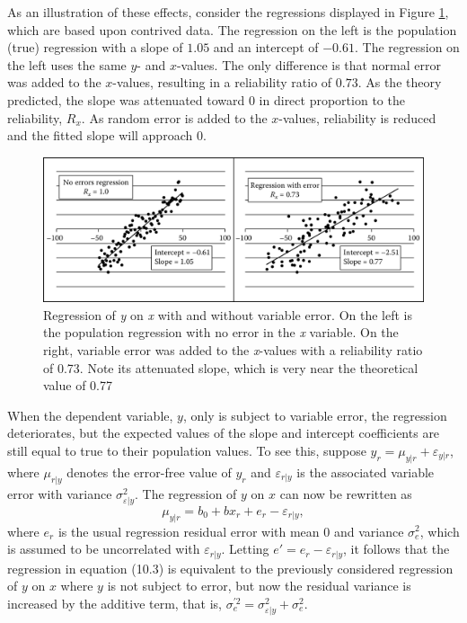 \documentclass[]{krantz}
\begin{document}
As an illustration of these effects, consider the regressions displayed
in Figure \ref{fig:fig10-6}, which are based upon contrived data. The
regression on the left is the population (true) regression with a slope
of \(1.05\) and an intercept of \(-0.61\). The regression on the left
uses the same \(y\)- and \(x\)-values. The only difference is that
normal error was added to the \(x\)-values, resulting in a reliability
ratio of \(0.73\). As the theory predicted, the slope was attenuated
toward \(0\) in direct proportion to the reliability, \(R_{x}\). As
random error is added to the \(x\)-values, reliability is reduced and
the fitted slope will approach \(0\).

\begin{figure}

{\centering \includegraphics[width=0.9\linewidth]{ChapterError/figures/fig10-6} 

}

\caption{Regression of \textit{y} on \textit{x} with and without variable error. On the left is the population regression with no error in the \textit{x} variable. On the right, variable error was added to the \textit{x}-values with a reliability ratio of 0.73. Note its attenuated slope, which is very near the theoretical value of 0.77}\label{fig:fig10-6}
\end{figure}

When the dependent variable, \(y\), only is subject to variable error,
the regression deteriorates, but the expected values of the slope and
intercept coefficients are still equal to true to their population
values. To see this, suppose
\(y_r = \mu_{y\vert r} + \varepsilon_{y\vert r}\), where
\(\mu_{r\vert y}\) denotes the error-free value of \(y_r\) and
\(\varepsilon_{r\vert y}\) is the associated variable error with
variance \(\sigma _{\varepsilon \vert y}^2\). The regression of \(y\) on
\(x\) can now be rewritten as \[\label{eq:10-1.12}
\mu_{y\vert r} = b_0 + bx_r + e_r - \varepsilon _{r\vert y},\] where
\(e_r\) is the usual regression residual error with mean \(0\) and
variance \(\sigma_e^2\), which is assumed to be uncorrelated with
\(\varepsilon_{r\vert y}\). Letting
\({e}' = e_r - \varepsilon_{r\vert y}\), it follows that the regression
in equation (10.3) is equivalent to the previously considered regression
of \(y\) on \(x\) where \(y\) is not subject to error, but now the
residual variance is increased by the additive term, that is,
\(\sigma_{e}^{\prime2} = \sigma_{\varepsilon \vert y}^2 + \sigma_e^2\).
\end{document}
